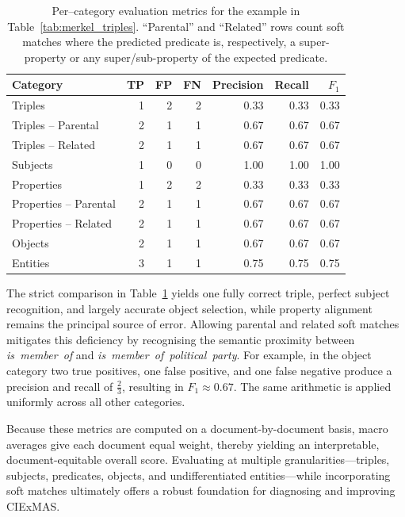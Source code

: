 \documentclass[a4paper,oneside,bibliography=totoc]{scrbook}
\begin{document}
\begin{table}[ht]
  \centering
  \label{tab:merkel_metrics}
  \begin{tabular}{lrrrrrr}
    \toprule
    Category               & TP & FP & FN & Precision & Recall & $F_1$ \\ \midrule
    Triples                & 1  & 2  & 2  & 0.33      & 0.33   & 0.33  \\
    Triples -- Parental    & 2  & 1  & 1  & 0.67      & 0.67   & 0.67  \\
    Triples -- Related     & 2  & 1  & 1  & 0.67      & 0.67   & 0.67  \\
    Subjects               & 1  & 0  & 0  & 1.00      & 1.00   & 1.00  \\
    Properties             & 1  & 2  & 2  & 0.33      & 0.33   & 0.33  \\
    Properties -- Parental & 2  & 1  & 1  & 0.67      & 0.67   & 0.67  \\
    Properties -- Related  & 2  & 1  & 1  & 0.67      & 0.67   & 0.67  \\
    Objects                & 2  & 1  & 1  & 0.67      & 0.67   & 0.67  \\
    Entities               & 3  & 1  & 1  & 0.75      & 0.75   & 0.75  \\
    \bottomrule
  \end{tabular}
  \caption{Per--category evaluation metrics for the example in Table~\ref{tab:merkel_triples}.  “Parental” and “Related” rows count soft matches where the predicted predicate is, respectively, a super-property or any super/sub-property of the expected predicate.}
\end{table}

The strict comparison in Table~\ref{tab:merkel_metrics} yields one fully correct triple, perfect subject recognition, and largely accurate object selection, while property alignment remains the principal source of error.  Allowing parental and related soft matches mitigates this deficiency by recognising the semantic proximity between \textit{is~member~of} and \textit{is~member~of~political~party}.  For example, in the object category two true positives, one false positive, and one false negative produce a precision and recall of $\tfrac{2}{3}$, resulting in $F_1\approx0.67$.  The same arithmetic is applied uniformly across all other categories.

Because these metrics are computed on a document-by-document basis, macro averages give each document equal weight, thereby yielding an interpretable, document-equitable overall score.  Evaluating at multiple granularities—triples, subjects, predicates, objects, and undifferentiated entities—while incorporating soft matches ultimately offers a robust foundation for diagnosing and improving CIExMAS.
\end{document}
